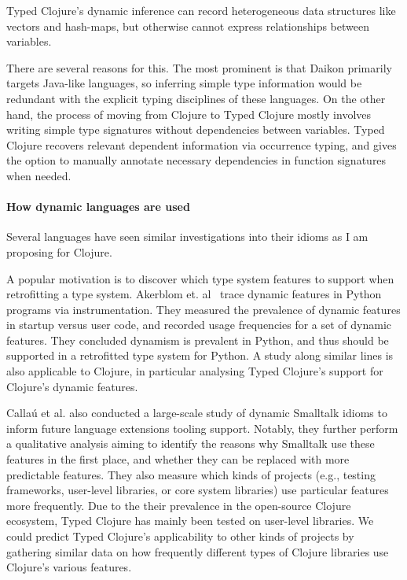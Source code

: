 \documentclass[9pt]{extarticle}
\begin{document}
Typed Clojure's dynamic inference can record heterogeneous data structures
like vectors and hash-maps, but otherwise cannot express relationships
between variables.

There are several reasons for this. The most prominent is that Daikon
primarily targets Java-like languages, so inferring simple type information
would be redundant with the explicit typing disciplines of these languages.
On the other hand, the process of moving from Clojure to Typed Clojure
mostly involves writing simple type signatures without dependencies
between variables. Typed Clojure recovers relevant dependent information
via occurrence typing, and gives the option to manually annotate necessary
dependencies in function signatures when needed.


\paragraph{How dynamic languages are used}
Several languages have seen similar investigations
into their idioms as I am proposing for Clojure.

A popular motivation is to discover which type system features to support
when retrofitting a type system.
Akerblom et. al~\cite{Akerblom:2014:TDF:2597073.2597103} trace dynamic features in Python programs
via instrumentation. They measured the prevalence of dynamic features in startup versus
user code, and recorded usage frequencies for a set of dynamic features.
They concluded dynamism is prevalent in Python, and thus should be supported
in a retrofitted type system for Python.
A study along similar lines is also applicable to Clojure, in particular analysing Typed
Clojure's support for Clojure's dynamic features.

Calla{\'u} et al. \cite{Callau2013} also conducted a large-scale study of
dynamic Smalltalk idioms to inform future language extensions tooling support.
Notably, they further perform a qualitative analysis aiming to identify
the reasons why Smalltalk use these features in the first place, and
whether they can be replaced with more predictable features. They also 
measure which kinds of projects (e.g., testing frameworks, user-level libraries, or core system libraries) 
use particular features more frequently.
Due to the their prevalence in the open-source Clojure ecosystem,
Typed Clojure has mainly been tested on user-level libraries.
We could predict Typed Clojure's applicability to other kinds of projects
by gathering similar data on how frequently different types of Clojure libraries use
Clojure's various features.
\end{document}
